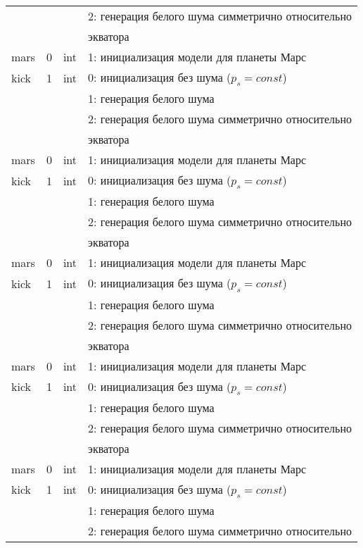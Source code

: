 \begin{longtable}[c]{|l|c|l|l|}
          &   &     & 2: генерация белого шума симметрично относительно \\
      & & & экватора    \\
     mars & 0 & int & 1: инициализация модели для планеты Марс     \\
    kick & 1 & int & 0: инициализация без шума ($p_s = const$) \\
          &   &     & 1: генерация белого шума                  \\
          &   &     & 2: генерация белого шума симметрично относительно \\
      & & & экватора    \\
     mars & 0 & int & 1: инициализация модели для планеты Марс     \\
    kick & 1 & int & 0: инициализация без шума ($p_s = const$) \\
          &   &     & 1: генерация белого шума                  \\
          &   &     & 2: генерация белого шума симметрично относительно \\
      & & & экватора    \\
     mars & 0 & int & 1: инициализация модели для планеты Марс     \\
    kick & 1 & int & 0: инициализация без шума ($p_s = const$) \\
          &   &     & 1: генерация белого шума                  \\
          &   &     & 2: генерация белого шума симметрично относительно \\
      & & & экватора    \\
     mars & 0 & int & 1: инициализация модели для планеты Марс     \\
    kick & 1 & int & 0: инициализация без шума ($p_s = const$) \\
          &   &     & 1: генерация белого шума                  \\
          &   &     & 2: генерация белого шума симметрично относительно \\
      & & & экватора    \\
     mars & 0 & int & 1: инициализация модели для планеты Марс     \\
    kick & 1 & int & 0: инициализация без шума ($p_s = const$) \\
          &   &     & 1: генерация белого шума                  \\
          &   &     & 2: генерация белого шума симметрично относительно \\

\end{longtable}

